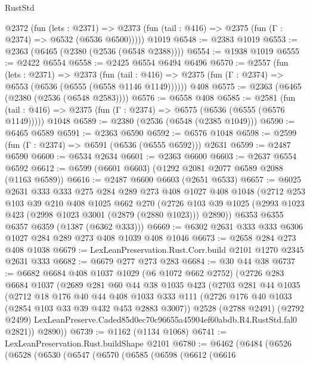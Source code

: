 \begin{lexlean}{RustStd}
\begin{coremodule}
    @2372
      (fun (lets : @2371) =>
      @2373 (fun (tail : @416) => @2375 (fun (Γ : @2374) => @6532 (@6536 @6500)))))
    @1019
@6548 := @2383 @1019
@6553 := @2363 (@6465 (@2380 (@2536 (@6548 @2388))))
@6554 := @1938 @1019
@6555 := @2422 @6554
@6558 := @2425 @6554 @6494 @6496
@6570 := @2557
    (fun (lets : @2371) =>
    @2373
      (fun (tail : @416) => @2375 (fun (Γ : @2374) => @6553 (@6536 (@6555 (@6558 @1146 @1149))))))
    @408
@6575 := @2363 (@6465 (@2380 (@2536 (@6548 @2583))))
@6576 := @6558 @408
@6585 := @2581
    (fun (tail : @416) => @2375 (fun (Γ : @2374) => @6575 (@6536 (@6555 (@6576 @1149)))))
    @1048
@6589 := @2380 (@2536 (@6548 (@2385 @1049)))
@6590 := @6465 @6589
@6591 := @2363 @6590
@6592 := @6576 @1048
@6598 := @2599 (fun (Γ : @2374) => @6591 (@6536 (@6555 @6592))) @2631
@6599 := @2487 @6590
@6600 := @6534 @2634
@6601 := @2363 @6600
@6603 := @2637 @6554 @6592
@6612 := @6599 (@6601 @6603) (@1292 @2081 @2077 @6589 @2088 (@1163 @6589))
@6616 := @2487 @6600 @6603 (@2651 @6533)
@6657 := @6025
    @2631
    @333
    @333
    @275
    @284
    @289
    @273
    @408
    @1027
    @408
    @1048
    (@2712
      @253
      @103
      @39
      @210
      @408
      @1025
      @662
      @270
      (@2726 @103 @39 @1025 (@2993 @1023 @423 (@2998 @1023 @3001 (@2879 (@2880 @1023))) @2890))
      @6353
      @6355
      @6357
      @6359
      (@1387 (@6362 @333)))
@6669 := @6302 @2631 @333 @333 @6306 @1027 @284 @289 @273 @408 @1039 @408 @1046
@6673 := @2658 @284 @273 @408 @1038
@6679 := LexLeanPreservation.Rust.Corr.build @2101 @1270 @2345 @2631 @333
@6682 := @6679 @277 @273 @283
@6684 := @30 @44 @38
@6737 := @6682
    @6684
    @408
    @1037
    @1029
    (@6 @1072 @662 @2752)
    (@2726
      @283
      @6684
      @1037
      (@2689
        @281
        @60
        @44
        @38
        @1035
        @423
        (@2703
          @281
          @44
          @1035
          (@2712
            @18
            @176
            @40
            @44
            @408
            @1033
            @333
            @111
            (@2726 @176 @40 @1033 (@2854 @103 @33 @39 @432 @453 @2883 @3007))
            @2528
            (@2788 @2491)
            (@2792 @2499)
            LexLeanPreserve.Caded85d0ec70c96655a45904ef60abdb.R4.RustStd.fal0
            @2821))
        @2890))
@6739 := @1162 (@1134 @1068)
@6741 := LexLeanPreservation.Rust.buildShape @2101
@6780 := @6462
    (@6484
      (@6526
        (@6528
          (@6530
            (@6547
              (@6570
                (@6585
                  (@6598
                    (@6612
                      (@6616

\end{coremodule}
\end{lexlean}
